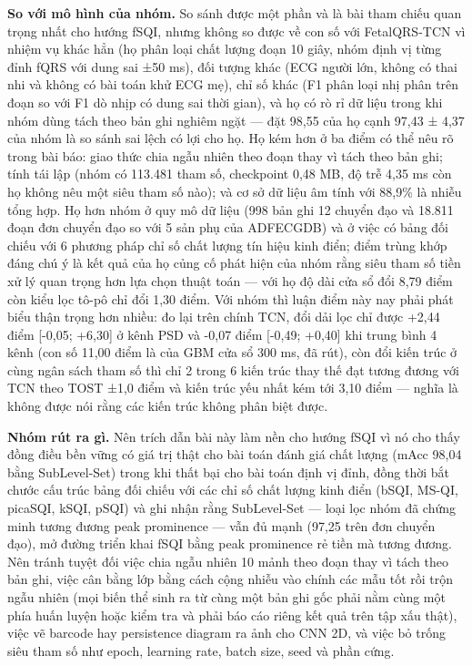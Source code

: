 \documentclass[12pt,a4paper]{article}
\begin{document}
\noindent \textbf{\color{tdtblue}So với mô hình của nhóm.} So sánh được một phần và là bài tham chiếu quan trọng nhất cho hướng fSQI, nhưng không so được về con số với FetalQRS-TCN vì nhiệm vụ khác hẳn (họ phân loại chất lượng đoạn 10 giây, nhóm định vị từng đỉnh fQRS với dung sai ±50 ms), đối tượng khác (ECG người lớn, không có thai nhi và không có bài toán khử ECG mẹ), chỉ số khác (F1 phân loại nhị phân trên đoạn so với F1 dò nhịp có dung sai thời gian), và họ có rò rỉ dữ liệu trong khi nhóm dùng tách theo bản ghi nghiêm ngặt — đặt 98,55 của họ cạnh 97,43 ± 4,37 của nhóm là so sánh sai lệch có lợi cho họ. Họ kém hơn ở ba điểm có thể nêu rõ trong bài báo: giao thức chia ngẫu nhiên theo đoạn thay vì tách theo bản ghi; tính tái lập (nhóm có 113.481 tham số, checkpoint 0,48 MB, độ trễ 4,35 ms còn họ không nêu một siêu tham số nào); và cơ sở dữ liệu âm tính với 88,9\% là nhiễu tổng hợp. Họ hơn nhóm ở quy mô dữ liệu (998 bản ghi 12 chuyển đạo và 18.811 đoạn đơn chuyển đạo so với 5 sản phụ của ADFECGDB) và ở việc có bảng đối chiếu với 6 phương pháp chỉ số chất lượng tín hiệu kinh điển; điểm trùng khớp đáng chú ý là kết quả của họ củng cố phát hiện của nhóm rằng siêu tham số tiền xử lý quan trọng hơn lựa chọn thuật toán — với họ độ dài cửa sổ đổi 8,79 điểm còn kiểu lọc tô-pô chỉ đổi 1,30 điểm. Với nhóm thì luận điểm này nay phải phát biểu thận trọng hơn nhiều: đo lại trên chính TCN, đổi dải lọc chỉ được +2,44 điểm [-0,05; +6,30] ở kênh PSD và -0,07 điểm [-0,49; +0,40] khi trung bình 4 kênh (con số 11,00 điểm là của GBM cửa sổ 300 ms, đã rút), còn đổi kiến trúc ở cùng ngân sách tham số thì chỉ 2 trong 6 kiến trúc thay thế đạt tương đương với TCN theo TOST ±1,0 điểm và kiến trúc yếu nhất kém tới 3,10 điểm — nghĩa là không được nói rằng các kiến trúc không phân biệt được.\par\vspace{3pt}
\noindent \textbf{\color{tdtblue}Nhóm rút ra gì.} Nên trích dẫn bài này làm nền cho hướng fSQI vì nó cho thấy đồng điều bền vững có giá trị thật cho bài toán đánh giá chất lượng (mAcc 98,04 bằng SubLevel-Set) trong khi thất bại cho bài toán định vị đỉnh, đồng thời bắt chước cấu trúc bảng đối chiếu với các chỉ số chất lượng kinh điển (bSQI, MS-QI, picaSQI, kSQI, pSQI) và ghi nhận rằng SubLevel-Set — loại lọc nhóm đã chứng minh tương đương peak prominence — vẫn đủ mạnh (97,25 trên đơn chuyển đạo), mở đường triển khai fSQI bằng peak prominence rẻ tiền mà tương đương. Nên tránh tuyệt đối việc chia ngẫu nhiên 10 mảnh theo đoạn thay vì tách theo bản ghi, việc cân bằng lớp bằng cách cộng nhiễu vào chính các mẫu tốt rồi trộn ngẫu nhiên (mọi biến thể sinh ra từ cùng một bản ghi gốc phải nằm cùng một phía huấn luyện hoặc kiểm tra và phải báo cáo riêng kết quả trên tập xấu thật), việc vẽ barcode hay persistence diagram ra ảnh cho CNN 2D, và việc bỏ trống siêu tham số như epoch, learning rate, batch size, seed và phần cứng.\par\vspace{3pt}
\vspace{6pt}
\end{document}
